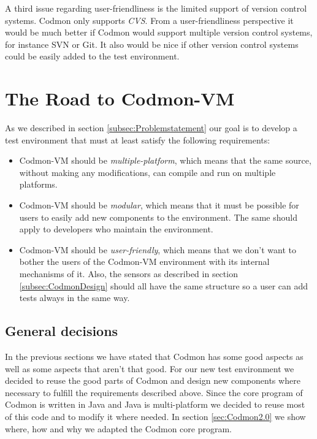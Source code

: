 \documentclass{article}
\newcommand{\project}{Codmon-VM}
\begin{document}
\noindent A third issue regarding user-friendliness is the limited support of version control systems. Codmon only supports \emph{CVS}\cite{CVS}. From a user-friendliness perspective it would be much better 
if Codmon would support multiple version control systems, for instance SVN\cite{SVN} or Git\cite{Git}. It also would be nice if other version control systems could be easily added to the test environment.


\section{The Road to \project{}}
\label{sec:road}
As we described in section \ref{subsec:Problemstatement} our goal is to develop a test environment that must at least satisfy the following requirements:

\begin{itemize}
\item \project{} should be \emph{multiple-platform}, which means that the same source, without making any modifications, can compile and run on multiple platforms.
\item \project{} should be \emph{modular}, which means that it must be possible for users to easily add new components to the environment. The same should apply to developers who maintain the environment.
\item \project{} should be \emph{user-friendly}, which means that we don't want to bother the users of the \project{} environment with its internal mechanisms of it. Also, the sensors as described in 
section \ref{subsec:CodmonDesign} should all have the same structure so a user can add tests always in the same way.
\end{itemize}

\subsection{General decisions}
\label{subsec:general}
In the previous sections we have stated that Codmon has some good aspects as well as some aspects that aren't that good. For our new test environment we decided to reuse the good parts of Codmon and design 
new components where necessary to fulfill the requirements described above. Since the core program of Codmon is written in Java and Java is multi-platform we decided to reuse most of this code and to 
modify it where needed. In section \ref{sec:Codmon2.0} we show where, how and why we adapted the Codmon core program. 
\end{document}
